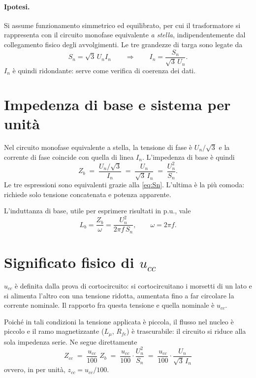 \documentclass[11pt,a4paper]{article}
\begin{document}
\paragraph{Ipotesi.} Si assume funzionamento simmetrico ed equilibrato, per cui il
trasformatore si rappresenta con il circuito monofase equivalente \emph{a stella},
indipendentemente dal collegamento fisico degli avvolgimenti. Le tre grandezze di targa
sono legate da
\begin{equation}
S_n = \sqrt{3}\, U_n I_n
\qquad\Longrightarrow\qquad
I_n = \frac{S_n}{\sqrt{3}\,U_n}.
\label{eq:Sn}
\end{equation}
$I_n$ è quindi ridondante: serve come verifica di coerenza dei dati.

\section{Impedenza di base e sistema per unità}

Nel circuito monofase equivalente a stella, la tensione di fase è $U_n/\sqrt{3}$ e la
corrente di fase coincide con quella di linea $I_n$. L'impedenza di base è quindi
\begin{equation}
Z_b \;=\; \frac{U_n/\sqrt{3}}{I_n} \;=\; \frac{U_n}{\sqrt{3}\,I_n} \;=\; \frac{U_n^2}{S_n}.
\label{eq:Zb}
\end{equation}
Le tre espressioni sono equivalenti grazie alla \eqref{eq:Sn}. L'ultima è la più comoda:
richiede solo tensione concatenata e potenza apparente.

L'induttanza di base, utile per esprimere risultati in p.u., vale
\begin{equation}
L_b = \frac{Z_b}{\omega} = \frac{U_n^2}{2\pi f\, S_n}, \qquad \omega = 2\pi f .
\end{equation}

\section{Significato fisico di $u_{cc}$}

$u_{cc}$ è definita dalla prova di cortocircuito: si cortocircuitano i morsetti di un
lato e si alimenta l'altro con una tensione ridotta, aumentata fino a far circolare la
corrente nominale. Il rapporto fra questa tensione e quella nominale è $u_{cc}$.

Poiché in tali condizioni la tensione applicata è piccola, il flusso nel nucleo è piccolo
e il ramo magnetizzante ($L_\mu$, $R_{fe}$) è trascurabile: il circuito si riduce alla
sola impedenza serie. Ne segue direttamente
\begin{equation}
\boxed{\;Z_{cc} \;=\; \frac{u_{cc}}{100}\; Z_b \;=\; \frac{u_{cc}}{100}\cdot\frac{U_n^2}{S_n}
\;=\;\frac{u_{cc}}{100}\cdot\frac{U_n}{\sqrt{3}\,I_n}\;}
\label{eq:Zcc}
\end{equation}
ovvero, in per unità, $z_{cc} = u_{cc}/100$.
\end{document}
